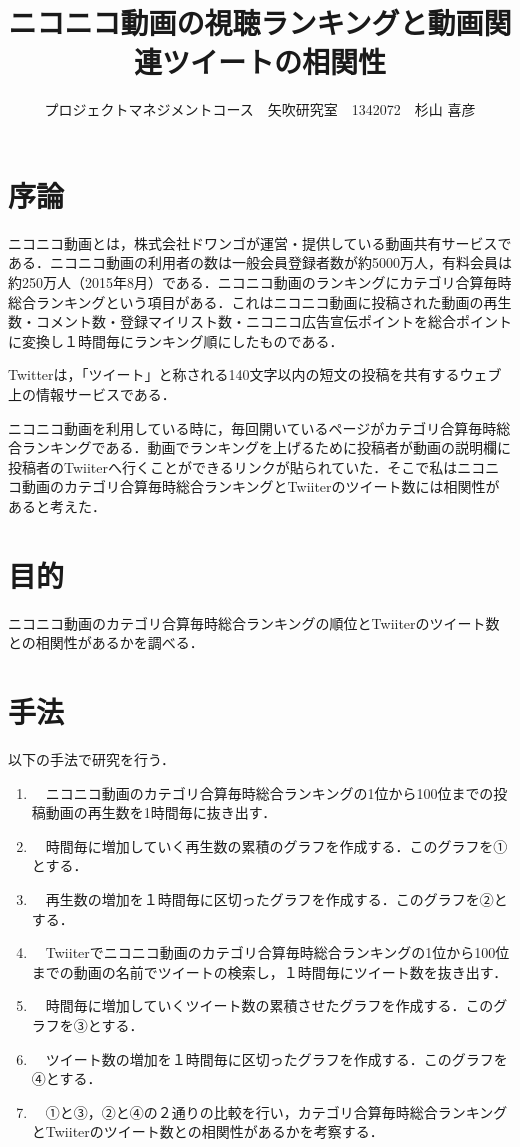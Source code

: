 \documentclass[uplatex,twocolumn,dvipdfmx]{jsarticle}
\title{\vspace{-5mm}\fontsize{14pt}{0pt}\selectfont ニコニコ動画の視聴ランキングと動画関連ツイートの相関性 }
\author{\normalsize プロジェクトマネジメントコース　矢吹研究室　1342072　杉山 喜彦}
\date{}
\begin{document}
\fontsize{10.5pt}{\baselineskip}\selectfont
\maketitle





\section{序論}

ニコニコ動画とは，株式会社ドワンゴが運営・提供している動画共有サービスである．ニコニコ動画の利用者の数は一般会員登録者数が約5000万人，有料会員は約250万人（2015年8月）である\cite{iii}．ニコニコ動画のランキングにカテゴリ合算毎時総合ランキングという項目がある．これはニコニコ動画に投稿された動画の再生数・コメント数・登録マイリスト数・ニコニコ広告宣伝ポイントを総合ポイントに変換し１時間毎にランキング順にしたものである．

Twitterは，「ツイート」と称される140文字以内の短文の投稿を共有するウェブ上の情報サービスである．

ニコニコ動画を利用している時に，毎回開いているページがカテゴリ合算毎時総合ランキングである．動画でランキングを上げるために投稿者が動画の説明欄に投稿者のTwiiterへ行くことができるリンクが貼られていた．そこで私はニコニコ動画のカテゴリ合算毎時総合ランキングとTwiiterのツイート数には相関性があると考えた．
\noindent

\section{目的}
ニコニコ動画のカテゴリ合算毎時総合ランキングの順位とTwiiterのツイート数との相関性があるかを調べる．
\section{手法}

以下の手法で研究を行う．

\begin{enumerate}

\item　ニコニコ動画のカテゴリ合算毎時総合ランキングの1位から100位までの投稿動画の再生数を1時間毎に抜き出す．
\item　時間毎に増加していく再生数の累積のグラフを作成する．このグラフを①とする．
\item　再生数の増加を１時間毎に区切ったグラフを作成する．このグラフを②とする．
\item　Twiiterでニコニコ動画のカテゴリ合算毎時総合ランキングの1位から100位までの動画の名前でツイートの検索し，１時間毎にツイート数を抜き出す．
\item　時間毎に増加していくツイート数の累積させたグラフを作成する．このグラフを③とする．
\item　ツイート数の増加を１時間毎に区切ったグラフを作成する．このグラフを④とする．
\item　①と③，②と④の２通りの比較を行い，カテゴリ合算毎時総合ランキングとTwiiterのツイート数との相関性があるかを考察する．

\end{enumerate}
\end{document}
